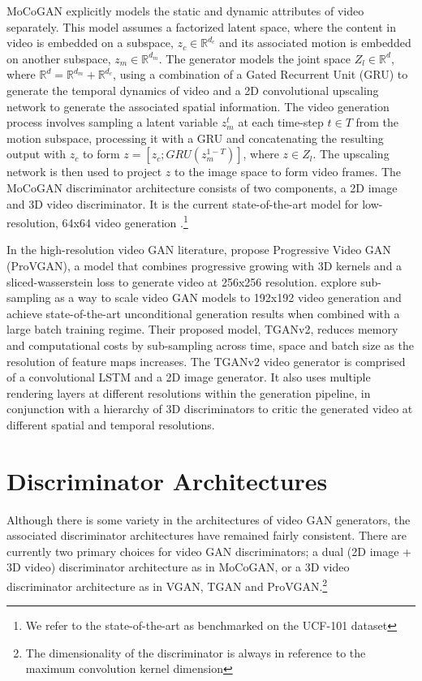 \documentclass[a4paper,fleqn]{cas-sc}
\begin{document}
MoCoGAN \cite{Tulyakov0YK18mocogan} explicitly models the static and dynamic attributes of video separately. This model assumes a factorized latent space, where the content in video is embedded on a subspace, $z_c \in \mathbb{R}^{d_c}$ and its associated motion is embedded on another subspace, $z_m \in \mathbb{R}^{d_m}$. The generator models the joint space $Z_l \in \mathbb{R}^d$, where $\mathbb{R}^d = \mathbb{R}^{d_m} + \mathbb{R}^{d_c}$, using a combination of a Gated Recurrent Unit (GRU) \cite{cho-etal-2014-learning} to generate the temporal dynamics of video and a 2D convolutional upscaling network to generate the associated spatial information. The video generation process involves sampling a latent variable $z_m^t$ at each time-step $t \in T$ from the motion subspace, processing it with a GRU and concatenating the resulting output with $z_c$ to form $z = [z_c;GRU(z_m^{1-T})]$, where $z \in Z_l$. The upscaling network is then used to project $z$ to the image space to form video frames. The MoCoGAN discriminator architecture consists of two components, a 2D image and 3D video discriminator. It is the current state-of-the-art model for low-resolution, 64x64 video generation \cite{soomroZS2012ucf101}.\footnote{We refer to the state-of-the-art as benchmarked on the UCF-101 dataset}

In the high-resolution video GAN literature, \citet{AcharyaHPG2018towards} propose Progressive Video GAN (ProVGAN), a model that combines progressive growing with 3D kernels and a sliced-wasserstein loss to generate video at 256x256 resolution. \citet{saito2018tganv2} explore sub-sampling as a way to scale video GAN models to 192x192 video generation and achieve state-of-the-art unconditional generation results when combined with a large batch training regime. Their proposed model, TGANv2, reduces memory and computational costs by sub-sampling across time, space and batch size as the resolution of feature maps increases. The TGANv2 video generator is comprised of a convolutional LSTM and a 2D image generator. It also uses multiple rendering layers at different resolutions within the generation pipeline, in conjunction with a hierarchy of 3D discriminators to critic the generated video at different spatial and temporal resolutions.

\section{Discriminator Architectures}
\label{sec:disc_arch}
Although there is some variety in the architectures of video GAN generators, the associated discriminator architectures have remained fairly consistent. There are currently two primary choices for video GAN discriminators; a dual (2D image + 3D video) discriminator architecture as in MoCoGAN, or a 3D video discriminator architecture as in VGAN, TGAN and ProVGAN.\footnote{The dimensionality of the discriminator is always in reference to the maximum convolution kernel dimension}
\end{document}
